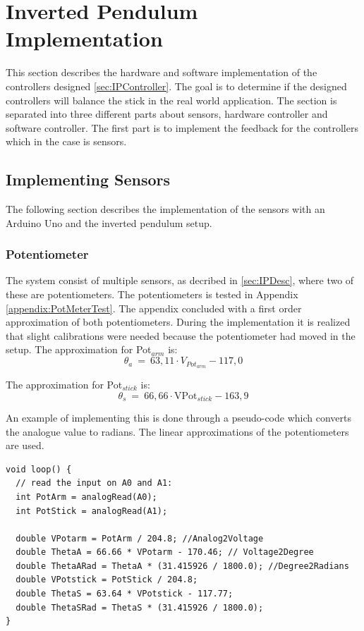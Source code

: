 \chapter{Inverted Pendulum Implementation}\label{sec:InvPendImp}
This section describes the hardware and software implementation of the controllers designed \autoref{sec:IPController}. The goal is to determine if the designed controllers will balance the stick in the real world application. The section is separated into three different parts about sensors, hardware controller and software controller. The first part is to implement the feedback for the controllers which in the case is sensors. 

\section{Implementing Sensors}
The following section describes the implementation of the sensors with an Arduino Uno and the inverted pendulum setup.   

\subsection*{Potentiometer}\label{section:PotmeterImplementation}
The system consist of multiple sensors, as decribed in \autoref{sec:IPDesc}, where two of these are potentiometers. The potentiometers is tested in Appendix \ref{appendix:PotMeterTest}. The appendix concluded with a first order approximation of both potentiometers. During the implementation it is realized that slight calibrations were needed because the potentiometer had moved in the setup. The approximation for Pot$_{arm}$ is:
\begin{equation}
\theta_a\ =\ 63,11 \cdot V_{{Pot}_{arm}} - 117,0
\end{equation}
\startexplain
\stopexplain

The approximation for Pot$_{stick}$ is:
\begin{equation}
\theta_s\ =\ 66,66 \cdot \text{VPot}_{stick} - 163,9
\end{equation}
\startexplain
\stopexplain

An example of implementing this is done through a pseudo-code which converts the analogue value to radians. The linear approximations of the potentiometers are used.
\begin{lstlisting}
void loop() {
  // read the input on A0 and A1:
  int PotArm = analogRead(A0);
  int PotStick = analogRead(A1);

  double VPotarm = PotArm / 204.8; //Analog2Voltage
  double ThetaA = 66.66 * VPotarm - 170.46; // Voltage2Degree
  double ThetaARad = ThetaA * (31.415926 / 1800.0); //Degree2Radians
  double VPotstick = PotStick / 204.8;
  double ThetaS = 63.64 * VPotstick - 117.77;
  double ThetaSRad = ThetaS * (31.415926 / 1800.0);
}
\end{lstlisting}    


